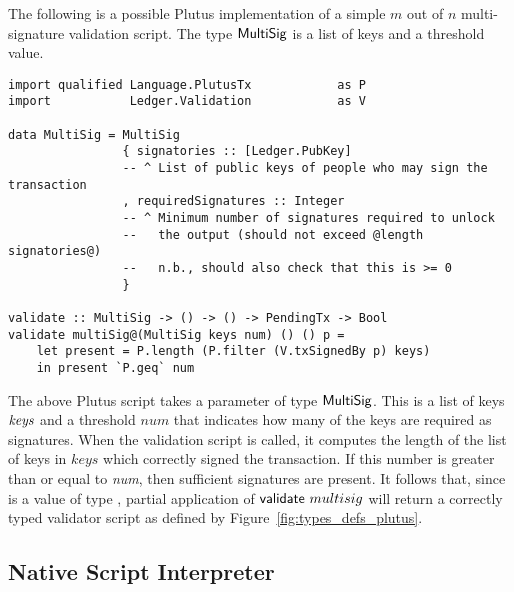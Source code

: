 \documentclass[11pt,a4paper,dvipsnames]{article}
\theoremstyle{definition}
\begin{document}
The following is a possible Plutus implementation of a simple $m$ out of $n$
multi-signature validation script. The type $\mathsf{MultiSig}$ is a list of keys
and a threshold value.

\begin{verbatim}
import qualified Language.PlutusTx            as P
import           Ledger.Validation            as V

data MultiSig = MultiSig
                { signatories :: [Ledger.PubKey]
                -- ^ List of public keys of people who may sign the transaction
                , requiredSignatures :: Integer
                -- ^ Minimum number of signatures required to unlock
                --   the output (should not exceed @length signatories@)
                --   n.b., should also check that this is >= 0
                }

validate :: MultiSig -> () -> () -> PendingTx -> Bool
validate multiSig@(MultiSig keys num) () () p =
    let present = P.length (P.filter (V.txSignedBy p) keys)
    in present `P.geq` num
\end{verbatim}

The above Plutus script takes a parameter  of type
$\mathsf{MultiSig}$.  This is a list of keys $\mathit{keys}$ and a threshold $num$
that indicates how many of the keys are required as signatures. When the
validation script is called, it computes the length of the list of keys in $keys$ which correctly signed
the transaction. If this number is greater than or equal to \emph{num},
then sufficient signatures are present. It follows that, since
 is a value of type , partial application of
$\mathsf{validate}~multisig$ will return a correctly typed validator script
as defined by Figure~\ref{fig:types_defs_plutus}.

\subsection{Native Script Interpreter}
\label{sec:native-script-interp}
\end{document}

